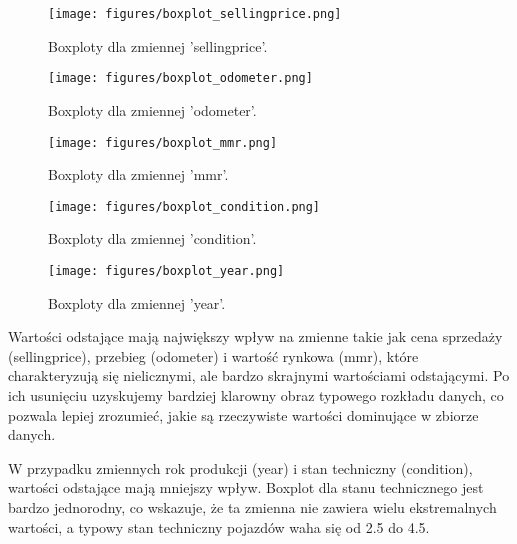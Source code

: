 \documentclass[10pt,letterpaper]{article}
\begin{document}
\begin{figure}[H]
\begin{center}
   \texttt{[image: figures/boxplot\_sellingprice.png]}
   \caption{Boxploty dla zmiennej 'sellingprice'.}
   \label{fig:other-figure-log}
\end{center}
\end{figure}

\begin{figure}[H]
\begin{center}
   \texttt{[image: figures/boxplot\_odometer.png]}
   \caption{Boxploty dla zmiennej 'odometer'.}
   \label{fig:other-figure-log}
\end{center}
\end{figure}

\begin{figure}[H]
\begin{center}
   \texttt{[image: figures/boxplot\_mmr.png]}
   \caption{Boxploty dla zmiennej 'mmr'.}
   \label{fig:other-figure-log}
\end{center}
\end{figure}

\begin{figure}[H]
\begin{center}
   \texttt{[image: figures/boxplot\_condition.png]}
   \caption{Boxploty dla zmiennej 'condition'.}
   \label{fig:other-figure-log}
\end{center}
\end{figure}

\begin{figure}[H]
\begin{center}
   \texttt{[image: figures/boxplot\_year.png]}
   \caption{Boxploty dla zmiennej 'year'.}
   \label{fig:other-figure-log}
\end{center}
\end{figure}

Wartości odstające mają największy wpływ na zmienne takie jak cena sprzedaży (sellingprice), przebieg (odometer) i wartość rynkowa (mmr), które charakteryzują się nielicznymi, ale bardzo skrajnymi wartościami odstającymi. Po ich usunięciu uzyskujemy bardziej klarowny obraz typowego rozkładu danych, co pozwala lepiej zrozumieć, jakie są rzeczywiste wartości dominujące w zbiorze danych.

W przypadku zmiennych rok produkcji (year) i stan techniczny (condition), wartości odstające mają mniejszy wpływ. Boxplot dla stanu technicznego jest bardzo jednorodny, co wskazuje, że ta zmienna nie zawiera wielu ekstremalnych wartości, a typowy stan techniczny pojazdów waha się od 2.5 do 4.5.
\end{document}
